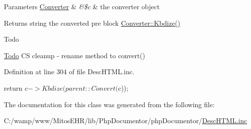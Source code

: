 \begin{DoxyParams}[1]{\-Parameters}
\hyperlink{class_converter}{\-Converter} & {\em \&\$c} & the converter object\\
\hline
\end{DoxyParams}
\begin{DoxyReturn}{\-Returns}
string the converted pre block  \hyperlink{class_converter_a08cf61c157a1d774be4c962ddc751ed9}{\-Converter\-::\-Kbdize()} 
\end{DoxyReturn}
\begin{DoxyRefDesc}{\-Todo}
\item[\hyperlink{todo__todo000038}{\-Todo}]\-C\-S cleanup -\/ rename method to convert() \end{DoxyRefDesc}


\-Definition at line 304 of file \-Desc\-H\-T\-M\-L.\-inc.


\begin{DoxyCode}
    {
        return $c->Kbdize(parent::Convert($c));
    }
\end{DoxyCode}


\-The documentation for this class was generated from the following file\-:\begin{DoxyCompactItemize}
\item 
\-C\-:/wamp/www/\-Mitos\-E\-H\-R/lib/\-Php\-Documentor/php\-Documentor/\hyperlink{_desc_h_t_m_l_8inc}{\-Desc\-H\-T\-M\-L.\-inc}\end{DoxyCompactItemize}
